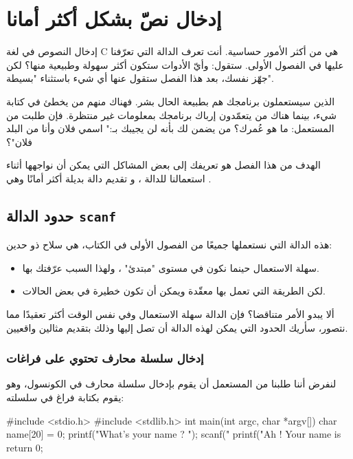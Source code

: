 \chapter{إدخال نصّ بشكل أكثر أمانا}

إدخال النصوص في لغة \textenglish{C}
هي من أكثر الأمور حساسية. أنت تعرف الدالة
التي تعرّفنا عليها في الفصول الأولى. ستقول: وأيّ الأدوات ستكون أكثر سهولة وطبيعية منها؟ لكن جهّز نفسك، بعد هذا الفصل ستقول عنها أي شيء باستثناء "بسيطة".

الذين سيستعملون برنامجك هم بطبيعة الحال بشر. فهناك منهم من يخطئ في كتابة شيء، بينما هناك من يتعمّدون إرباك برنامجك بمعلومات غير منتظرة. فإن طلبت من المستعمل: ما هو عُمرك؟ من يضمن لك بأنه لن يجيبك بـ:" اسمي فلان وأنا من البلد فلان"؟

الهدف من هذا الفصل هو تعريفك إلى بعض المشاكل التي يمكن أن نواجهها أثناء استعمالنا للدالة
،
و تقديم دالة بديلة أكثر أمانًا وهي
.

\section{حدود الدالة \texttt{scanf}}

هذه الدالة التي نستعملها جميعًا من الفصول الأولى في الكتاب، هي سلاح ذو حدين:

\begin{itemize}
  \item سهلة الاستعمال حينما نكون في مستوى "مبتدئ" ، ولهذا السبب عرّفتك بها.
  \item لكن الطريقة التي تعمل بها معقّدة ويمكن أن تكون خطيرة في بعض الحالات.
\end{itemize}

ألا يبدو الأمر متناقضا؟ فإن الدالة
سهلة الاستعمال وفي نفس الوقت أكثر تعقيدًا مما نتصور، سأريك الحدود التي يمكن لهذه الدالة أن تصل إليها وذلك بتقديم مثالين واقعيين.

\subsection{إدخال سلسلة محارف تحتوي على فراغات }

لنفرض أننا طلبنا من المستعمل أن يقوم بإدخال سلسلة محارف في الكونسول، وهو يقوم بكتابة فراغ في سلسلته:

\begin{Csource}
#include <stdio.h>
#include <stdlib.h>
int main(int argc, char *argv[])
{
	char name[20] = {0};
	printf("What's your name ? ");
	scanf("%
	printf("Ah ! Your name is %
	return 0;
}
\end{Csource}


